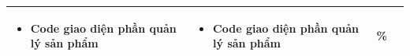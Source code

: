 \documentclass[a4paper,12pt]{report}
\begin{document}
\begin{center}
\begin{longtable}{|>{\centering\arraybackslash}p{3cm}|
        >{\centering\arraybackslash}p{5.5cm}|
        >{\centering\arraybackslash}p{5.5cm}|
        >{\centering\arraybackslash}p{1.5cm}|}
\begin{itemize}
            \item Code giao diện phần quản lý sản phẩm
        \end{itemize}
                                                                                                                                      &
        \begin{itemize}
            \item Code giao diện phần quản lý sản phẩm
        \end{itemize}                                                                                    & 100\%                              \\
        \hline
    \end{longtable}
\end{center}

\vspace{1em}
\end{document}
